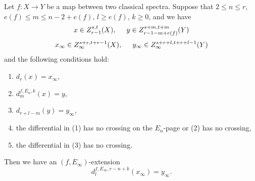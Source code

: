 \begin{theorem}\label{thm:gen-leibniz-k-fwd}
    Let $f: X\to Y$ be a map between two classical spectra.
    Suppose that $2\le n\le r$, $e(f)\le m\le n-2+e(f)$, $l\ge e(f)$, $k\ge 0$, and we have
    $$x\in Z_{r-1}^{s,t}(X), \hspace{0.5cm} y\in Z_{r-1-m+e(f)}^{s+m,t+m}(Y)$$
    $$x_\infty\in Z_\infty^{s+r,t+r-1}(X), \hspace{0.5cm} y_\infty\in Z_\infty^{s+r+l,t+r+l-1}(Y)$$
    and the following conditions hold:
    \begin{enumerate}
        \item $d_{r}(x)=x_\infty$,
        \item $d_{m}^{f,E_n, k}(x)=y$,
        \item $d_{r+l-m}(y)= y_\infty$,
        \item the differential in (1) has no crossing on the $E_n$-page or (2) has no crossing,
        \item the differential in (3) has no crossing.
    \end{enumerate}
    Then we have an $(f,E_\infty)$-extension
    $$d_{l}^{f,E_\infty, r-n+k}(x_\infty)=y_\infty.$$
\end{theorem}

